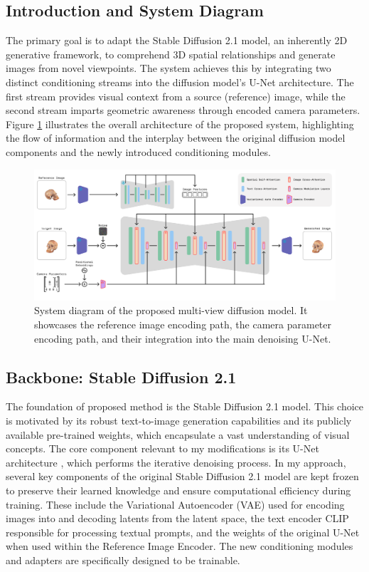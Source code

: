 \subsection{Introduction and System Diagram}
The primary goal is to adapt the Stable Diffusion 2.1 model, an inherently 2D generative framework, to comprehend 3D spatial relationships and generate images from novel viewpoints. The system achieves this by integrating two distinct conditioning streams into the diffusion model's U-Net architecture. The first stream provides visual context from a source (reference) image, while the second stream imparts geometric awareness through encoded camera parameters.
Figure \ref{fig:my-method-diagram} illustrates the overall architecture of the proposed system, highlighting the flow of information and the interplay between the original diffusion model components and the newly introduced conditioning modules.

\begin{figure}[htbp]
  \centering
  \includegraphics[width=\textwidth]{images/proposed-method/my-method-diagram.png}
  \caption{System diagram of the proposed multi-view diffusion model. It showcases the reference image encoding path, the camera parameter encoding path, and their integration into the main denoising U-Net.}
  \label{fig:my-method-diagram}
\end{figure}

\subsection{Backbone: Stable Diffusion 2.1}
The foundation of proposed method is the Stable Diffusion 2.1 model. This choice is motivated by its robust text-to-image generation capabilities and its publicly available pre-trained weights, which encapsulate a vast understanding of visual concepts. The core component relevant to my modifications is its U-Net architecture \cite{unet}, which performs the iterative denoising process.
In my approach, several key components of the original Stable Diffusion 2.1 model are kept frozen to preserve their learned knowledge and ensure computational efficiency during training. These include the Variational Autoencoder (VAE) \cite{vae} used for encoding images into and decoding latents from the latent space, the text encoder CLIP \cite{clip} responsible for processing textual prompts, and the weights of the original U-Net when used within the Reference Image Encoder. The new conditioning modules and adapters are specifically designed to be trainable.

